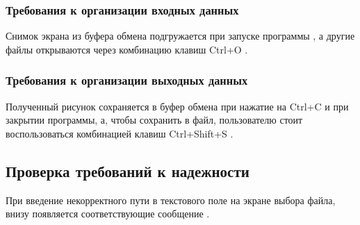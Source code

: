 \documentclass[a4paper,12pt]{article}
\begin{document}
  \subsubsection{Требования к организации входных данных}
  Снимок экрана из буфера обмена подгружается при запуске программы ,
  а другие файлы открываются через комбинацию клавиш Ctrl+O .

  \subsubsection{Требования к организации выходных данных}
  Полученный рисунок сохраняется в буфер обмена при нажатие на Ctrl+C и при закрытии программы,
  а, чтобы сохранить в файл, пользователю стоит воспользоваться комбинацией клавиш Ctrl+Shift+S .

  \subsection{Проверка требований к надежности}
  При введение некорректного пути в текстового поле на экране выбора файла, внизу появляется соответствующие сообщение .

  \begin{CRTbibliography}
  \end{CRTbibliography}

  \CRTterminology

  \CRTlistRegistration
\end{document}
